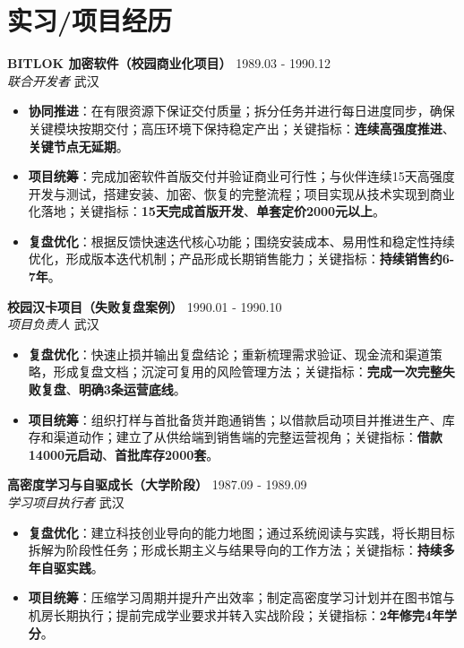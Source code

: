 \documentclass[a4paper,10pt]{article}
\begin{document}
\section*{实习/项目经历}
\textbf{BITLOK 加密软件（校园商业化项目）} \hfill 1989.03 - 1990.12 \\
\textit{联合开发者} \hfill 武汉
\begin{itemize}[leftmargin=*, itemsep=2pt, parsep=0pt, topsep=2pt]
    \item \textbf{协同推进}：在有限资源下保证交付质量；拆分任务并进行每日进度同步，确保关键模块按期交付；高压环境下保持稳定产出；关键指标：\textbf{连续高强度推进}、\textbf{关键节点无延期}。
    \item \textbf{项目统筹}：完成加密软件首版交付并验证商业可行性；与伙伴连续15天高强度开发与测试，搭建安装、加密、恢复的完整流程；项目实现从技术实现到商业化落地；关键指标：\textbf{15天完成首版开发}、\textbf{单套定价2000元以上}。
    \item \textbf{复盘优化}：根据反馈快速迭代核心功能；围绕安装成本、易用性和稳定性持续优化，形成版本迭代机制；产品形成长期销售能力；关键指标：\textbf{持续销售约6-7年}。
\end{itemize}
\textbf{校园汉卡项目（失败复盘案例）} \hfill 1990.01 - 1990.10 \\
\textit{项目负责人} \hfill 武汉
\begin{itemize}[leftmargin=*, itemsep=2pt, parsep=0pt, topsep=2pt]
    \item \textbf{复盘优化}：快速止损并输出复盘结论；重新梳理需求验证、现金流和渠道策略，形成复盘文档；沉淀可复用的风险管理方法；关键指标：\textbf{完成一次完整失败复盘}、\textbf{明确3条运营底线}。
    \item \textbf{项目统筹}：组织打样与首批备货并跑通销售；以借款启动项目并推进生产、库存和渠道动作；建立了从供给端到销售端的完整运营视角；关键指标：\textbf{借款14000元启动}、\textbf{首批库存2000套}。
\end{itemize}
\textbf{高密度学习与自驱成长（大学阶段）} \hfill 1987.09 - 1989.09 \\
\textit{学习项目执行者} \hfill 武汉
\begin{itemize}[leftmargin=*, itemsep=2pt, parsep=0pt, topsep=2pt]
    \item \textbf{复盘优化}：建立科技创业导向的能力地图；通过系统阅读与实践，将长期目标拆解为阶段性任务；形成长期主义与结果导向的工作方法；关键指标：\textbf{持续多年自驱实践}。
    \item \textbf{项目统筹}：压缩学习周期并提升产出效率；制定高密度学习计划并在图书馆与机房长期执行；提前完成学业要求并转入实战阶段；关键指标：\textbf{2年修完4年学分}。
\end{itemize}
\end{document}
